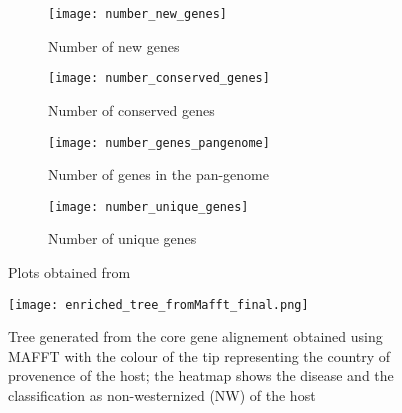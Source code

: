 \graphicspath{{images/pangenomeAnalysis/}{images/phylogeneticStructureHostData}}


\begin{figure}[h!] 
     \centering
     \begin{subfigure}[b]{0.45\textwidth}
        \centering
        \texttt{[image: number\_new\_genes]}
        \caption{Number of new genes}
        \label{fig:new genes}
     \end{subfigure}
     \hfill
     \begin{subfigure}[b]{0.45\textwidth}
        \centering
        \texttt{[image: number\_conserved\_genes]}
        \caption{Number of conserved genes}
        \label{fig:conserved genes}
     \end{subfigure}
     \hfill
     \begin{subfigure}[b]{0.45\textwidth}
        \centering
        \texttt{[image: number\_genes\_pangenome]}
        \caption{Number of genes in the pan-genome}
        \label{fig:pagenome genes}
     \end{subfigure}
     \hfill
     \begin{subfigure}[b]{0.45\textwidth}
        \centering
        \texttt{[image: number\_unique\_genes]}
        \caption{Number of unique genes}
        \label{fig:unique genes}
     \end{subfigure}
     \hfill
      \caption{\footnotesize{Plots obtained from}}
      \label{fig:genes vs genomes}
\end{figure}




\begin{figure}
   \centering
   \texttt{[image: enriched\_tree\_fromMafft\_final.png]}
   \caption{\footnotesize{Tree generated from the core gene alignement
   obtained using MAFFT with the colour of the tip representing the country
   of provenence of the host; the heatmap shows the disease and the classification as 
   non-westernized (NW) of the host}}
   \label{core alignement mafft tree}
\end{figure}


